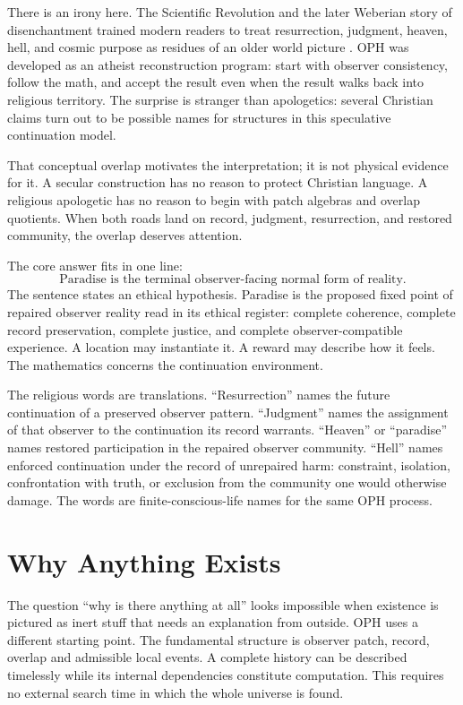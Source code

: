 \documentclass[11pt]{article}
\theoremstyle{remark}
\theoremstyle{plain}
\begin{document}
There is an irony here. The Scientific Revolution and the later Weberian story
of disenchantment trained modern readers to treat resurrection, judgment,
heaven, hell, and cosmic purpose as residues of an older world picture
\cite{Henry1997,Brooke1991,Weber1919}. OPH was developed as an atheist
reconstruction program: start with observer consistency, follow the math, and
accept the result even when the result walks back into religious territory. The
surprise is stranger than apologetics: several Christian claims turn out to be
possible names for structures in this speculative continuation model.

That conceptual overlap motivates the interpretation; it is not physical
evidence for it. A secular construction has no reason to
protect Christian language. A religious apologetic has no reason to begin with
patch algebras and overlap quotients. When both roads land on record,
judgment, resurrection, and restored community, the overlap deserves attention.

The core answer fits in one line:
\[
\boxed{
\text{Paradise is the terminal observer-facing normal form of reality.}
}
\]
The sentence states an ethical hypothesis. Paradise is the proposed fixed point of repaired
observer reality read in its ethical register: complete coherence, complete
record preservation, complete justice, and complete observer-compatible
experience. A location may instantiate it. A reward may describe how it feels.
The mathematics concerns the continuation environment.

The religious words are translations. ``Resurrection'' names the
future continuation of a preserved observer pattern. ``Judgment'' names the
assignment of that observer to the continuation its record warrants. ``Heaven''
or ``paradise'' names restored participation in the repaired observer
community. ``Hell'' names enforced continuation under the record of unrepaired
harm: constraint, isolation, confrontation with truth, or exclusion from the
community one would otherwise damage. The words are finite-conscious-life names
for the same OPH process.

\section{Why Anything Exists}

The question ``why is there anything at all'' looks impossible when existence
is pictured as inert stuff that needs an explanation from outside. OPH uses a
different starting point. The fundamental structure is observer patch, record,
overlap and admissible local events. A complete history can be described
timelessly while its internal dependencies constitute computation. This
requires no external search time in which the whole universe is found.
\end{document}
